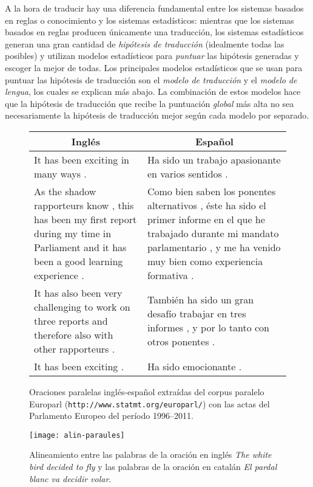 A la hora de traducir hay una diferencia fundamental entre los sistemas basados en reglas o conocimiento y los sistemas estadísticos: mientras que los sistemas basados en reglas producen únicamente una traducción, los sistemas estadísticos generan una gran cantidad de \emph{hipótesis de traducción} (idealmente todas las posibles) y utilizan modelos estadísticos para \emph{puntuar} las hipótesis generadas y escoger la mejor de todas. Los principales modelos estadísticos que se usan para puntuar las hipótesis de traducción son el \emph{modelo de traducción} y el \emph{modelo de lengua}, los cuales se explican más abajo. La combinación de estos modelos hace que la hipótesis de traducción que recibe la puntuación \emph{global} más alta no sea necesariamente la hipótesis de traducción mejor según cada modelo por separado. 

\begin{figure} \centering

\begin{tabular}{p{6cm}|p{6cm}} \multicolumn{1}{c|}{\textbf{Inglés}} &\multicolumn{1}{c}{\textbf{Español}}\\ \hline

It has been exciting in many ways . &Ha sido un trabajo apasionante en varios sentidos . \\ \hline

As the shadow rapporteurs know , this has been my first report during my time in Parliament and it has been a good learning experience . &Como bien saben los ponentes alternativos , éste ha sido el primer informe en el que he trabajado durante mi mandato parlamentario , y me ha venido muy bien como experiencia formativa . \\ \hline

It has also been very challenging to work on three reports and therefore also with other rapporteurs . &También ha sido un gran desafío trabajar en tres informes , y por lo tanto con otros ponentes . \\ \hline

It has been exciting . &Ha sido emocionante . \\ \hline

\end{tabular} \caption{Oraciones paralelas inglés-español extraídas del corpus paralelo Europarl (\texttt{http://www.statmt.org/europarl/}) con las actas del Parlamento Europeo del período 1996--2011.} \label{fg:alinora} \end{figure} 

\begin{figure} \centering

\texttt{[image: alin-paraules]} \caption{Alineamiento entre las palabras de la oración en inglés \emph{The white bird decided to fly} y las palabras de la oración en catalán \emph{El pardal blanc va decidir volar}.} \label{fg:alinpar} \end{figure} 

